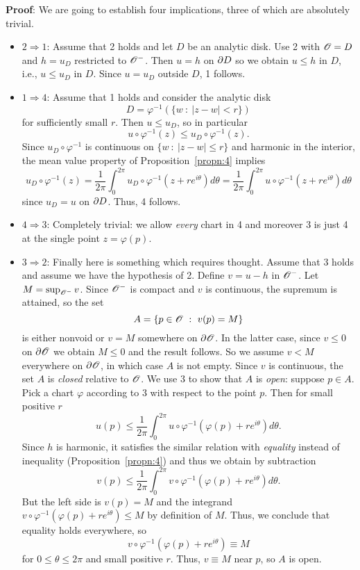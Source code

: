 \documentclass[a4paper,11pt]{article}
\begin{document}
\begin{mdframed}
  \textbf{Proof}: We are going to establish four implications, three
  of which are absolutely trivial.

  \begin{itemize}
  \item $2 \Rightarrow 1$: Assume that 2 holds and let $D$ be an
    analytic disk.  Use 2 with ${\mathscr{O}} = D$ and $h = u_D$ restricted to
    ${\mathscr{O}}^-$.  Then $u = h$ on $\partial D$ so we obtain $u \le h$ in $D$,
    i.e., $u \le u_D$ in $D$.  Since $u = u_D$ outside $D$, 1 follows.
  \item $1 \Rightarrow 4$: Assume that 1 holds and consider the
    analytic disk
    $$
    D = \varphi^{-1}(\{w ~:~ |z-w| < r\})
    $$
    for sufficiently small $r$.  Then $u \le u_D$, so in particular
    $$
    u \circ \varphi^{-1}(z) \le u_D \circ \varphi^{-1}(z).
    $$
    Since $u_D \circ \varphi^{-1}$ is continuous on $\{w ~:~ |z-w| \le
    r\}$ and harmonic in the interior, the mean value property of
    Proposition~\ref{propn:4} implies
    $$
    u_D \circ \varphi^{-1}(z)
    = \frac{1}{2\pi} \int_0^{2\pi} u_D \circ
    \varphi^{-1}(z+re^{i\theta}) d \theta
    = \frac{1}{2\pi} \int_0^{2\pi} u \circ
    \varphi^{-1}(z+re^{i\theta}) d \theta
    $$
    since $u_D = u$ on $\partial D$.  Thus, 4 follows.
  \item $4 \Rightarrow 3$: Completely trivial: we allow \emph{every}
    chart in 4 and moreover 3 is just 4 at the single point $z =
    \varphi(p)$.
  \item $3 \Rightarrow 2$: Finally here is something which requires
    thought.  Assume that 3 holds and assume we have the hypothesis of
    2.  Define $v = u-h$ in ${\mathscr{O}}^-$.  Let $M = \sup_{{\mathscr{O}}^-} v$.  Since
    ${\mathscr{O}}^-$ is compact and $v$ is continuous, the supremum is
    attained, so the set
    $$
    A = \{p \in {\mathscr{O}} ~:~ v(p) = M\}
    $$
    is either nonvoid or $v = M$ somewhere on $\partial {\mathscr{O}}$.  In the latter
    case, since $v \le 0$ on $\partial {\mathscr{O}}$ we obtain $M \le 0$ and the
    result follows. So we assume $v < M$ everywhere on $\partial {\mathscr{O}}$, in
    which case $A$ is not empty.  Since $v$ is continuous, the set $A$
    is \emph{closed} relative to ${\mathscr{O}}$.  We use 3 to show that $A$ is
    \emph{open}: suppose $p \in A$.  Pick a chart $\varphi$ according
    to 3 with respect to the point $p$.  Then for small positive $r$
    $$
    u(p) \le \frac{1}{2\pi}\int_0^{2\pi} u \circ
    \varphi^{-1}(\varphi(p) + re^{i\theta}) d \theta.
    $$
    Since $h$ is harmonic, it satisfies the similar relation with
    \emph{equality} instead of inequality (Proposition~\ref{propn:4})
    and thus we obtain by subtraction
    $$
    v(p) \le \frac{1}{2\pi} \int_0^{2\pi} v \circ
    \varphi^{-1}(\varphi(p) + re^{i\theta}) d\theta.
    $$
    But the left side is $v(p) = M$ and the integrand
    $v \circ \varphi^{-1}(\varphi(p) + re^{i\theta}) \le M$ by
    definition of $M$.  Thus, we conclude that equality holds
    everywhere, so
    $$
    v \circ \varphi^{-1}(\varphi(p) + re^{i\theta}) \equiv M
    $$
    for $0 \le \theta \le 2\pi$ and small positive $r$.  Thus, $v
    \equiv M$ near $p$, so $A$ is open.


\end{itemize}
\end{mdframed}
\end{document}
